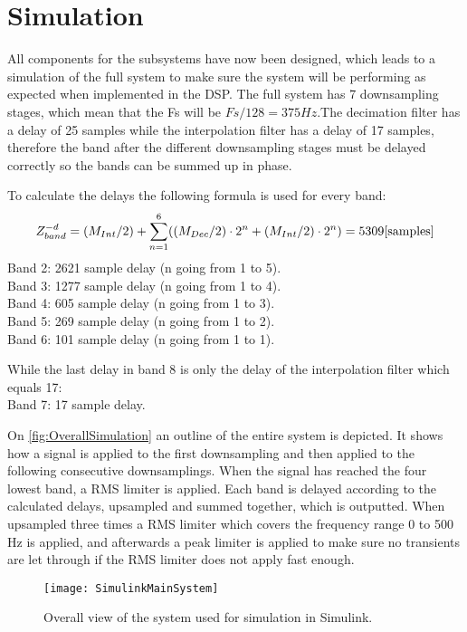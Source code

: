 \chapter{Simulation}
All components for the subsystems have now been designed, which leads to a simulation of the full system to make sure the system will be performing as expected when implemented in the DSP. The full system has 7 downsampling stages, which mean that the Fs will be $Fs/128=375 Hz$.The decimation filter has a delay of 25 samples  while the interpolation filter has a delay of 17 samples, therefore the band after the different downsampling stages must be delayed correctly so the bands can be summed up in phase. 

To calculate the delays the following formula is used for every band:
\begin{equation}
Z^{-d}_{band} = (M_{Int}/2) + \sum_{n=1}^{6} ((M_{Dec}/2)\cdot 2^n+(M_{Int}/2)\cdot 2^n) = 5309\enhed{samples}
\label{eq:delays}
\end{equation}
Band 2: 2621 sample delay (n going from 1 to 5). \\
Band 3: 1277 sample delay (n going from 1 to 4). \\
Band 4: 605 sample delay (n going from 1 to 3). \\
Band 5: 269 sample delay (n going from 1 to 2). \\
Band 6: 101 sample delay (n going from 1 to 1). 

While the last delay in band 8 is only the delay of the interpolation filter which equals 17: \\
Band 7: 17 sample delay.


On \autoref{fig:OverallSimulation} an outline of the entire system is depicted. It shows how a signal is applied to the first downsampling and then applied to the following consecutive downsamplings. When the signal has reached the four lowest band, a RMS limiter is applied. Each band is delayed according to the calculated delays, upsampled and summed together, which is outputted. When upsampled three times a RMS limiter which covers the frequency range 0 to 500 Hz is applied, and afterwards a peak limiter is applied to make sure no transients are let through if the RMS limiter does not apply fast enough.  

\begin{figure}[H]
\centering
\texttt{[image: SimulinkMainSystem]}
\label{fig:OverallSimulation}
\caption{Overall view of the system used for simulation in Simulink.}
\end{figure}

